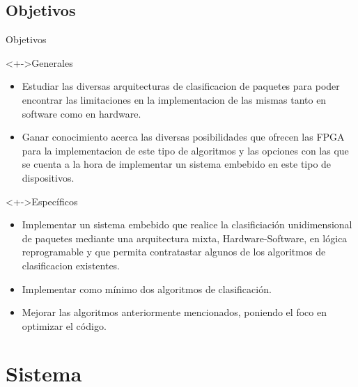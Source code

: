 \documentclass[xcolor=dvipsnames]{beamer}
\begin{document}
\subsection{Objetivos}
\begin{frame}{Objetivos}
\begin{block}<+->{Generales}   
    \begin{itemize}
      \scriptsize
      \item Estudiar las diversas arquitecturas de clasificacion de paquetes para poder encontrar las limitaciones en la implementacion de las mismas tanto en software como en hardware. 
      \item Ganar conocimiento acerca las diversas posibilidades que ofrecen las FPGA para la implementacion de este tipo de algoritmos y las opciones con las que se cuenta a la hora de implementar un sistema embebido en este tipo de dispositivos.
    \end{itemize}
  \end{block}
  
 \begin{block}<+->{Específicos}   
    \begin{itemize}
      \scriptsize
     \item Implementar un sistema embebido que realice la clasificiación unidimensional de paquetes mediante una arquitectura mixta, Hardware-Software, en lógica reprogramable y que permita contratastar algunos de los algoritmos de clasificacion existentes. 
	\item Implementar como mínimo dos algoritmos de clasificación. 
	\item Mejorar las algoritmos anteriormente mencionados, poniendo el foco en optimizar el código.
   
    \end{itemize}
  \end{block}
 \end{frame}

\section{Sistema}
\end{document}
